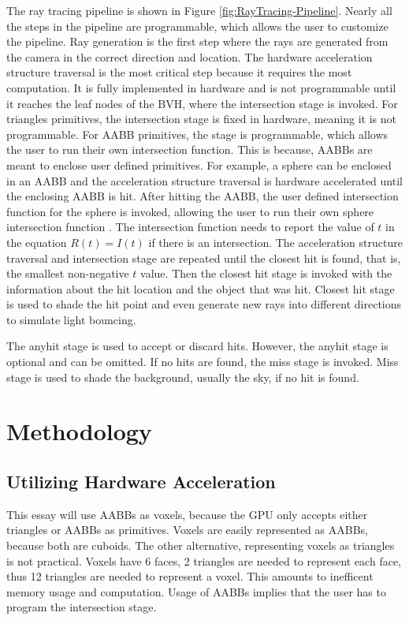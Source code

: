 \documentclass[12pt]{article}
\begin{document}
The ray tracing pipeline is shown in Figure \ref{fig:RayTracing-Pipeline}.
Nearly all the steps in the pipeline are programmable, which allows the user to customize the pipeline.
Ray generation is the first step where the rays are generated from the camera in the correct direction and location.
The hardware acceleration structure traversal is the most critical step because it requires the most computation.
It is fully implemented in hardware and is not programmable until it reaches the leaf nodes of the BVH, where the intersection stage is invoked.
For triangles primitives, the intersection stage is fixed in hardware, meaning it is not programmable.
For AABB primitives, the stage is programmable, which allows the user to run their own intersection function.
This is because, AABBs are meant to enclose user defined primitives.
For example, a sphere can be enclosed in an AABB and the acceleration structure traversal is hardware accelerated
until the enclosing AABB is hit. After hitting the AABB, the user defined intersection function for the sphere is invoked,
allowing the user to run their own sphere intersection function \parencite{NVIDIA:BVH-Patent}.
The intersection function needs to report the value of $t$ in the equation $R(t) = I(t)$ if there is an intersection.
The acceleration structure traversal and intersection stage are repeated until the closest hit is found,
that is, the smallest non-negative $t$ value. Then the closest hit stage is invoked with the information
about the hit location and the object that was hit.
Closest hit stage is used to shade the hit point and even generate new rays into different directions to simulate light bouncing.

The anyhit stage is used to accept or discard hits. However, the anyhit stage is optional and can be omitted.
If no hits are found, the miss stage is invoked.
Miss stage is used to shade the background, usually the sky, if no hit is found.
\parencite{NVIDIA:RTGems2}

\section{Methodology}

\subsection{Utilizing Hardware Acceleration}

This essay will use AABBs as voxels, because the GPU only accepts either triangles or AABBs as primitives.
Voxels are easily represented as AABBs, because both are cuboids.
The other alternative, representing voxels as triangles is not practical. Voxels have 6 faces, 2 triangles
are needed to represent each face, thus 12 triangles are needed to represent a voxel. This amounts to
inefficent memory usage and computation. Usage of AABBs implies that the user has to program the intersection stage.
\end{document}
